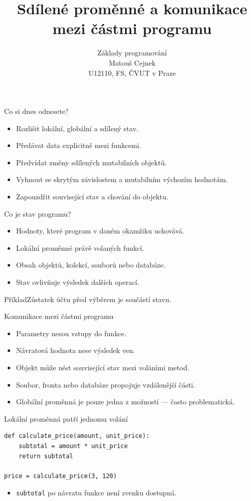 \documentclass[aspectratio=169]{beamer}
\title{Sdílené proměnné a komunikace mezi částmi programu}
\subtitle{Základy programování\\Matouš Cejnek\\U12110, FS, ČVUT v Praze}
\author{}\institute{}\date{}
\begin{document}
\begin{frame}\clearpage\thispagestyle{empty}\titlepage\end{frame}

\begin{frame}{Co si dnes odnesete?}
\begin{itemize}
\item Rozlišit lokální, globální a sdílený stav.
\item Předávat data explicitně mezi funkcemi.
\item Předvídat změny sdílených mutabilních objektů.
\item Vyhnout se skrytým závislostem a mutabilním výchozím hodnotám.
\item Zapouzdřit související stav a chování do objektu.
\end{itemize}
\end{frame}

\begin{frame}{Co je stav programu?}
\begin{itemize}
\item Hodnoty, které program v daném okamžiku uchovává.
\item Lokální proměnné právě volaných funkcí.
\item Obsah objektů, kolekcí, souborů nebo databáze.
\item Stav ovlivňuje výsledek dalších operací.
\end{itemize}
\begin{block}{Příklad}Zůstatek účtu před výběrem je součástí stavu.\end{block}
\end{frame}

\begin{frame}{Komunikace mezi částmi programu}
\begin{itemize}
\item Parametry nesou vstupy do funkce.
\item Návratová hodnota nese výsledek ven.
\item Objekt může nést související stav mezi voláními metod.
\item Soubor, fronta nebo databáze propojuje vzdálenější části.
\item Globální proměnná je pouze jedna z možností --- často problematická.
\end{itemize}
\end{frame}

\begin{frame}[fragile]{Lokální proměnná patří jednomu volání}
\begin{lstlisting}[style=python]
def calculate_price(amount, unit_price):
    subtotal = amount * unit_price
    return subtotal

price = calculate_price(3, 120)
\end{lstlisting}
\begin{itemize}\item \texttt{subtotal} po návratu funkce není zvenku dostupná.\end{itemize}
\end{frame}
\end{document}
